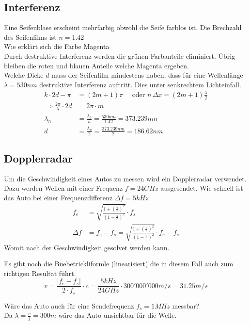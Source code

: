 \subsection{Interferenz}
Eine Seifenblase erscheint mehrfarbig obwohl die Seife farblos ist. Die Brechzahl des Seifenfilms ist $n=1.42$\\
Wie erklärt sich die Farbe Magenta\\
Durch destruktive Interferenz werden die grünen Farbanteile eliminiert. Übrig bleiben die roten und blauen Anteile welche Magenta ergeben.\\
Welche Dicke $d$ muss der Seifenfilm mindestens haben, dass für eine Wellenlänge $\lambda = 530nm$ destruktive Interferenz auftritt. Dies unter senkrechtem Lichteinfall.
\begin{align*}
k\cdot 2d -\pi &= (2m+1)\pi \quad  \textrm{ oder } n \, \Delta x = (2m+1) \frac{\lambda}{2}\\
\Rightarrow \frac{2\pi}{\lambda} \cdot 2d&=  2\pi \cdot m\\
\lambda_n &= \frac{\lambda_0}{n} = \frac{530nm}{1.42} = 373.239nm\\
d&= \frac{\lambda_n}{2}  = \frac{373.239nm}{2} = 186.62nm
\end{align*}	  	

\subsection{Dopplerradar}
Um die Geschwindigkeit eines Autos zu messen wird ein Dopplerradar verwendet. Dazu werden Wellen mit einer Frequenz $f=24 GHz$ ausgesendet. Wie schnell ist das Auto bei einer Frequenzdifferenz $\Delta f = 5kHz$
\begin{align*}
	f_e &= \sqrt{\frac{1+\left(\frac{u}{c}\right)^2}{\left(1-\frac{u}{c}\right)^2}}\cdot f_s\\	
	\Delta f &= f_e-f_s = \sqrt{\frac{1+\left(\frac{u}{c}\right)^2}{\left(1-\frac{u}{c}\right)^2}}\cdot f_s -f_s
\end{align*}
	Womit nach der Geschwindigkeit gesolvet werden kann.
	
Es gibt noch die Buebetrickliformle (linearisiert) die in diesem Fall auch zum richtigen Resultat führt.
\[
	v = \frac{|f_e - f_s|}{2\cdot f_s}\cdot c = \frac{5kHz}{24GHz}\cdot 300'000'000 m/s = 31.25m/s
\]

Wäre das Auto auch für eine Sendefrequenz $f_s = 1MHz$ messbar?\\
Da $\lambda = \frac{c}{f} = 300m$ wäre das Auto unsichtbar für die Welle.

